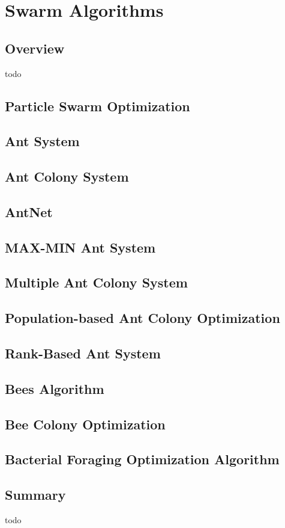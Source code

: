 \chapter{Swarm Algorithms}
\label{ch:swarm}

\section{Overview}
todo





\section{Particle Swarm Optimization}

\section{Ant System}
\section{Ant Colony System}
\section{AntNet}
\section{MAX-MIN Ant System}
\section{Multiple Ant Colony System}
\section{Population-based Ant Colony Optimization}
\section{Rank-Based Ant System}

\section{Bees Algorithm}
\section{Bee Colony Optimization}


\section{Bacterial Foraging Optimization Algorithm}


\section{Summary}
todo
